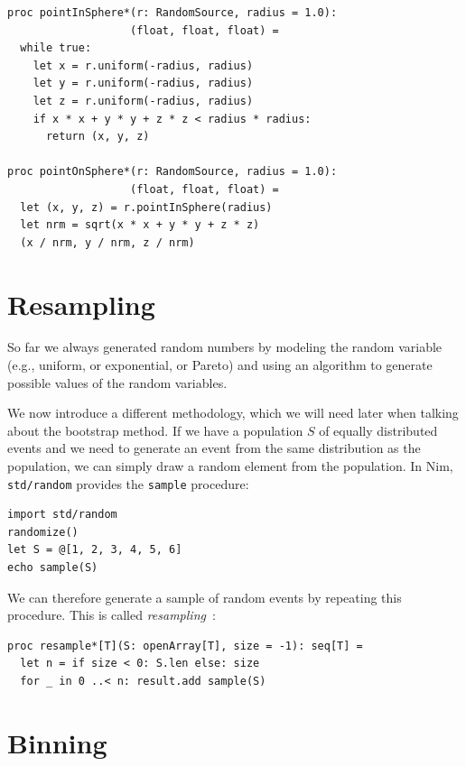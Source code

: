 \documentclass[justified, sixbynine]{tufte-book}
\def\ft{\small\tt}
\theoremstyle{plain}%
\newtheorem * {corollary}{Corollary}
\theoremstyle{definition}
\theoremstyle{remark}
\newtheorem * {remark}{Remark}
\newtheorem * {note}{Note}
\begin{document}
\begin{fullwidth}
\begin{lstlisting}[caption={in file: {\ft nlib/randomgen.nim}}]
proc pointInSphere*(r: RandomSource, radius = 1.0):
                   (float, float, float) =
  while true:
    let x = r.uniform(-radius, radius)
    let y = r.uniform(-radius, radius)
    let z = r.uniform(-radius, radius)
    if x * x + y * y + z * z < radius * radius:
      return (x, y, z)

proc pointOnSphere*(r: RandomSource, radius = 1.0):
                   (float, float, float) =
  let (x, y, z) = r.pointInSphere(radius)
  let nrm = sqrt(x * x + y * y + z * z)
  (x / nrm, y / nrm, z / nrm)
\end{lstlisting}

\section{Resampling}

So far we always generated random numbers by modeling the random variable (e.g., uniform, or exponential, or Pareto) and using an algorithm to generate possible values of the random variables.

We now introduce a different methodology, which we will need later when talking about the bootstrap method.
If we have a population $S$ of equally distributed events and we need to generate an event from the same distribution as the population, we can simply draw a random element from the population. In Nim, {\ft std/random} provides the {\ft sample} procedure:

\begin{lstlisting}
import std/random
randomize()
let S = @[1, 2, 3, 4, 5, 6]
echo sample(S)
\end{lstlisting}

We can therefore generate a sample of random events by repeating this procedure. This is called {\it resampling}~\cite{resampling}:

\begin{lstlisting}[caption={in file: {\ft nlib/randomgen.nim}}]
proc resample*[T](S: openArray[T], size = -1): seq[T] =
  let n = if size < 0: S.len else: size
  for _ in 0 ..< n: result.add sample(S)
\end{lstlisting}

\goodbreak\section{Binning}


\end{fullwidth}
\end{document}
